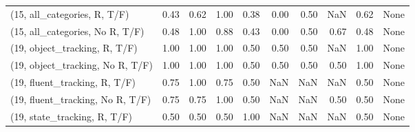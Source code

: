 \begin{table*}[h!]
\begin{adjustbox}{width=2\columnwidth,center}
\begin{tabular}{lrrr|rrr|rrr}
(15, all\_categories, R, T/F)          &                      0.43 &                  0.62 &                      1.00 &                          0.38 &                      0.00 &                          0.50 &                                    NaN &                               0.62 &                                  None \\
(15, all\_categories, No R, T/F)       &                      0.48 &                  1.00 &                      0.88 &                          0.43 &                      0.00 &                          0.50 &                                   0.67 &                               0.48 &                                  None \\



\midrule
(19, object\_tracking, R, T/F)         &                      1.00 &                  1.00 &                      1.00 &                          0.50 &                      0.50 &                          0.50 &                                    NaN &                               1.00 &                                  None \\
(19, object\_tracking, No R, T/F)      &                      1.00 &                  1.00 &                      1.00 &                          0.50 &                      0.50 &                          0.50 &                                   0.50 &                               1.00 &                                  None \\
(19, fluent\_tracking, R, T/F)         &                      0.75 &                  1.00 &                      0.75 &                          0.50 &                       NaN &                           NaN &                                    NaN &                               0.50 &                                  None \\
(19, fluent\_tracking, No R, T/F)      &                      0.75 &                  0.75 &                      1.00 &                          0.50 &                       NaN &                           NaN &                                   0.50 &                               0.50 &                                  None \\
(19, state\_tracking, R, T/F)          &                      0.50 &                  0.50 &                      0.50 &                          1.00 &                       NaN &                           NaN &                                    NaN &                               0.50 &                                  None \\

\end{tabular}
\end{adjustbox}
\end{table*}
